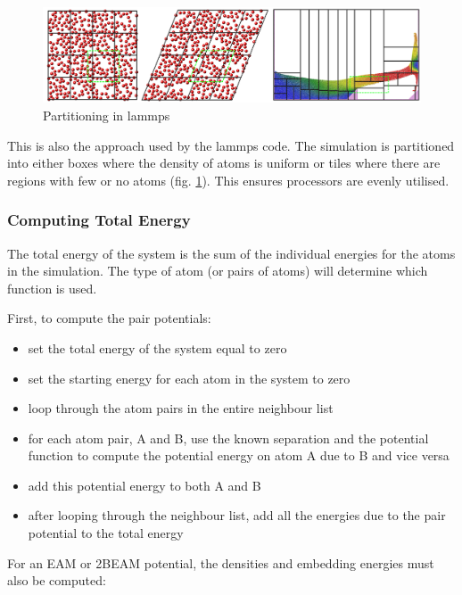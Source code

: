\begin{figure}[!htbp]
  \begin{center}
    \includegraphics[width=.6\linewidth]{chapters/background_potential_fitting/images/domain-decomp.png}
    \caption{Partitioning in \acrshort{lammps}\cite{lammpsdd}}
    \label{fig:lammpsdd}
  \end{center}
\end{figure}

This is also the approach used by the \acrshort{lammps} code.  The simulation is partitioned into either boxes where the density of atoms is uniform or tiles where there are regions with few or no atoms (fig. \ref{fig:lammpsdd}).  This ensures processors are evenly utilised.




\FloatBarrier
\subsubsection{Computing Total Energy}

The total energy of the system is the sum of the individual energies for the atoms in the simulation.  The type of atom (or pairs of atoms) will determine which function is used.

First, to compute the pair potentials:

\begin{itemize}
\item set the total energy of the system equal to zero
\item set the starting energy for each atom in the system to zero
\item loop through the atom pairs in the entire neighbour list
\item for each atom pair, A and B, use the known separation and the potential function to compute the potential energy on atom A due to B and vice versa
\item add this potential energy to both A and B
\item after looping through the neighbour list, add all the energies due to the pair potential to the total energy
\end{itemize}

For an EAM or 2BEAM potential, the densities and embedding energies must also be computed:


